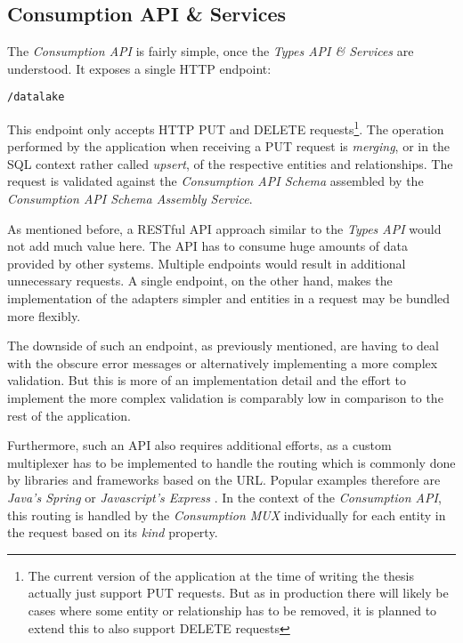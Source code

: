 \subsection{Consumption API \& Services}
The \emph{Consumption API} is fairly simple, once the \emph{Types API \& Services} are understood. It exposes a single HTTP endpoint:

\begin{lstlisting}[caption=Consumption API Endpoint, captionpos=b, label=lst:ConsumptionEndpoint]
/datalake
\end{lstlisting}

This endpoint only accepts HTTP PUT and DELETE requests\footnote{The current version of the application at the time of writing the thesis actually just support PUT requests. But as in production there will likely be cases where some entity or relationship has to be removed, it is planned to extend this to also support DELETE requests}. The operation performed by the application when receiving a PUT request is \emph{merging}, or in the SQL context rather called \emph{upsert}, of the respective entities and relationships. The request is validated against the \emph{Consumption API Schema} assembled by the \emph{Consumption API Schema Assembly Service}.\par 
As mentioned before, a RESTful API approach similar to the \emph{Types API} would not add much value here. The API has to consume huge amounts of data provided by other systems. Multiple endpoints would result in additional unnecessary requests. A single endpoint, on the other hand, makes the implementation of the adapters simpler and entities in a request may be bundled more flexibly.\par
The downside of such an endpoint, as previously mentioned, are having to deal with the obscure error messages or alternatively implementing a more complex validation. But this is more of an implementation detail and the effort to implement the more complex validation is comparably low in comparison to the rest of the application.\par
Furthermore, such an API also requires additional efforts, as a custom multiplexer has to be implemented to handle the routing which is commonly done by libraries and frameworks based on the URL. Popular examples therefore are \emph{Java's Spring} \cite{Spring} or \emph{Javascript's Express} \cite{Express}. In the context of the \emph{Consumption API}, this routing is handled by the \emph{Consumption MUX} individually for each entity in the request based on its \emph{kind} property. 

